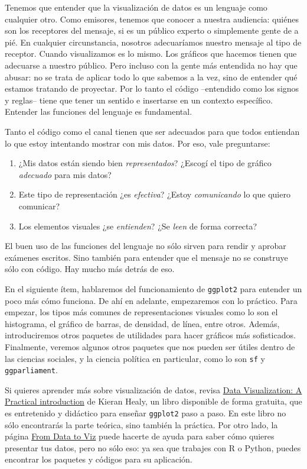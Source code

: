 \documentclass[]{book}
\providecommand{\tightlist}{%
  \setlength{\itemsep}{0pt}\setlength{\parskip}{0pt}}
\begin{document}
Tenemos que entender que la visualización de datos es un lenguaje como
cualquier otro. Como emisores, tenemos que conocer a nuestra audiencia:
quiénes son los receptores del mensaje, si es un público experto o
simplemente gente de a pié. En cualquier circunstancia, nosotros
adecuaríamos nuestro mensaje al tipo de receptor. Cuando visualizamos es
lo mismo. Los gráficos que hacemos tienen que adecuarse a nuestro
público. Pero incluso con la gente más entendida no hay que abusar: no
se trata de aplicar todo lo que sabemos a la vez, sino de entender qué
estamos tratando de proyectar. Por lo tanto el código --entendido como
los signos y reglas-- tiene que tener un sentido e insertarse en un
contexto específico. Entender las funciones del lenguaje es fundamental.

Tanto el código como el canal tienen que ser adecuados para que todos
entiendan lo que estoy intentando mostrar con mis datos. Por eso, vale
preguntarse:

\begin{enumerate}
\def\labelenumi{\arabic{enumi}.}
\tightlist
\item
  ¿Mis datos están siendo bien \emph{representados}? ¿Escogí el tipo de
  gráfico \emph{adecuado} para mis datos?
\item
  Este tipo de representación ¿es \emph{efectiva}? ¿Estoy
  \emph{comunicando} lo que quiero comunicar?
\item
  Los elementos visuales ¿se \emph{entienden}? ¿Se \emph{leen} de forma
  correcta?
\end{enumerate}

El buen uso de las funciones del lenguaje no sólo sirven para rendir y
aprobar exámenes escritos. Sino también para entender que el mensaje no
se construye sólo con código. Hay mucho más detrás de eso.

En el siguiente ítem, hablaremos del funcionamiento de \texttt{ggplot2}
para entender un poco más cómo funciona. De ahí en adelante, empezaremos
con lo práctico. Para empezar, los tipos más comunes de representaciones
visuales como lo son el histograma, el gráfico de barras, de densidad,
de línea, entre otros. Además, introduciremos otros paquetes de
utilidades para hacer gráficos más sofisticados. Finalmente, veremos
algunos otros paquetes que nos pueden ser útiles dentro de las ciencias
sociales, y la ciencia política en particular, como lo son \texttt{sf} y
\texttt{ggparliament}.

Si quieres aprender más sobre visualización de datos, revisa
\href{http://socviz.co}{Data Visualization: A Practical introduction} de
Kieran Healy, un libro disponible de forma gratuita, que es entretenido
y didáctico para enseñar \texttt{ggplot2} paso a paso. En este libro no
sólo encontrarás la parte teórica, sino también la práctica. Por otro
lado, la página \href{https://www.data-to-viz.com/}{From Data to Viz}
puede hacerte de ayuda para saber cómo quieres presentar tus datos, pero
no sólo eso: ya sea que trabajes con R o Python, puedes encontrar los
paquetes y códigos para su aplicación.
\end{document}
